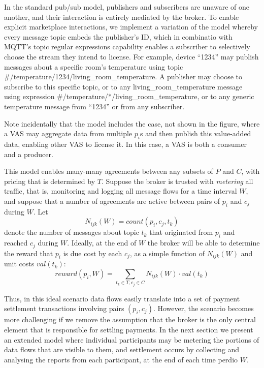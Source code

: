 \documentclass[conference]{IEEEtran}
\begin{document}
In the standard pub/sub model, publishers and subscribers are unaware of one another, and their interaction is entirely mediated by the broker. 
To enable explicit marketplace interactions, we implement a variation of the model whereby every message topic embeds the publisher's ID, which in combinatio with MQTT's topic regular expressions capability enables a subscriber to selectively choose the stream they intend to license.
For example, device ``1234'' may publish messages about a specific room's temperature using topic  \#/temperature/1234/living\_room\_temperature. 
A publisher may choose to subscribe to this specific topic, or to any  living\_room\_temperature message using expression \#/temperature/*/living\_room\_temperature, or to any generic temperature message from ``1234'' or from any subscriber.

Note incidentally that the model includes the case, not shown in the figure, where a VAS may aggregate data from multiple $ p_i $s and then publish this value-added data, enabling other VAS to license it. 
In this case, a VAS is both a consumer and a producer.

This model enables many-many agreements between any subsets of $P$ and $C$, with pricing that is determined by $T$.
Suppose the broker is trusted with \textit{metering} all traffic, that is, monitoring and logging all message flows for a time interval $W$, and suppose that a number of agreements are active between pairs of $p_i$ and $c_j$ during $W$.
Let 
\[N_{ijk}(W) = \mathit{count}(p_i, c_j, t_k)\]
denote the number of messages about topic $t_k$ that originated from $p_i$ and reached $c_j$ during $W$.
Ideally, at the end of $W$ the broker will be able to determine the reward that $p_i$ is due cost by each $c_j$, as a simple function of $N_{ijk}(W)$ and unit costs $\mathit{val}(t_k)$:
\begin{equation}
\mathit{reward}(p_i, W) = \sum_{t_k \in T, c_j \in C} N_{ijk}(W) \cdot \mathit{val}(t_k)
\label{eq:reward}
\end{equation}

Thus, in this ideal scenario data flows easily translate into a set of payment settlement transactions involving pairs $(p_i, c_j)$.
However, the scenario becomes more challenging if we remove the assumption that the broker is the only central element that is responsible for settling payments.
In the next section we present an extended model where individual participants may be metering the portions of data flows that are visible to them, and settlement occurs by collecting and analysing the reports from each participant, at the end of each time perdio $W$.
\end{document}
